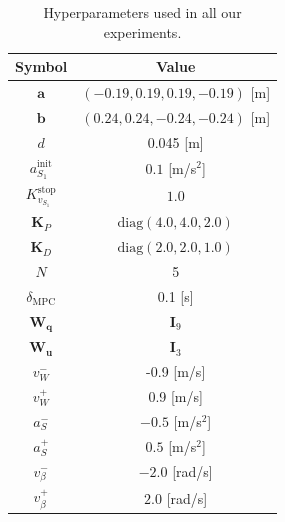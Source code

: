 \begin{table}
\centering
\begin{tabular}{ |c|c| } 
    \hline
    Symbol & Value \\
    \hline
    $\bm{a}$ & $(-0.19, 0.19, 0.19, -0.19)$ [m] \\
    $\bm{b}$ & $(0.24, 0.24, -0.24, -0.24)$ [m] \\
    $d$ & 0.045 [m] \\
    $a_{S_1}^{\mathrm{init}}$ & $0.1$ [m/s$^2$] \\ 
    $K_{v_{S_1}}^{\mathrm{stop}}$ & $1.0$ \\ 
    $\bm{K}_P$ & $\mathrm{diag}(4.0, 4.0, 2.0)$ \\ 
    $\bm{K}_D$ & $\mathrm{diag}(2.0, 2.0, 1.0)$ \\ 
    $N$ & 5 \\
    $\delta_{\mathrm{MPC}}$ & 0.1 [s] \\
    $\bm{W_q}$ & $\bm{I}_9$ \\ 
    $\bm{W_u}$ & $\bm{I}_3$ \\
    $v_W^-$ & -0.9 [m/s] \\
    $v_W^+$ & 0.9 [m/s] \\
    $a_S^-$ & $-0.5$ [m/s$^2$] \\ 
    $a_S^+$ & $0.5$ [m/s$^2$] \\ 
    $v_{\beta}^-$ & $-2.0$ [rad/s] \\ 
    $v_{\beta}^+$ & $2.0$ [rad/s] \\ 
    \hline
\end{tabular}
\caption{Hyperparameters used in all our experiments.}
\label{tab:hyperparameters}
\end{table}

